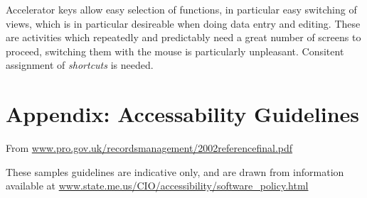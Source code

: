 Accelerator keys allow easy selection of functions, in particular easy
switching of views, which is in particular desireable when doing data
entry and editing. These are activities which repeatedly and
predictably need a great number of screens to proceed, switching them
with the mouse is particularly unpleasant. 
Consitent assignment of \textit{shortcuts} is needed.



\cbstart

\section{Appendix: Accessability Guidelines}
\label{sec:guiaccess}

From \url{www.pro.gov.uk/recordsmanagement/2002referencefinal.pdf}

These samples guidelines are
indicative only, and are drawn from information available at
\url {www.state.me.us/CIO/accessibility/software_policy.html}


